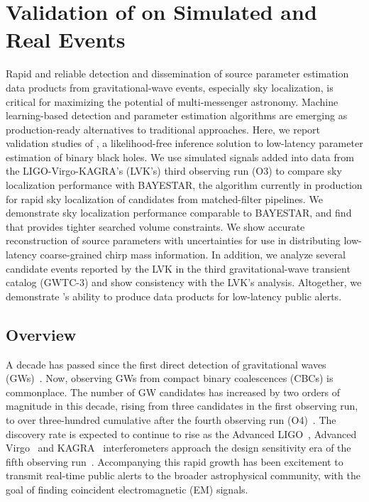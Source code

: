 \chapter{Validation of \amplfi on Simulated and Real Events}
\label{chap:amplfi_results}

\begin{refsection}

Rapid and reliable detection and dissemination of source parameter estimation data products from gravitational-wave events, especially sky localization, is critical for maximizing the potential of multi-messenger astronomy. 
Machine learning-based detection and parameter estimation algorithms are emerging as production-ready alternatives to traditional approaches. 
Here, we report validation studies of \amplfi, a likelihood-free inference solution to low-latency parameter estimation of binary black holes. 
We use simulated signals added into data from the LIGO-Virgo-KAGRA's (LVK's) third observing run (O3) to compare sky localization performance with BAYESTAR, the algorithm currently in production for rapid sky localization of candidates from matched-filter pipelines. 
We demonstrate sky localization performance comparable to BAYESTAR, and find that \amplfi provides tighter searched volume constraints. 
We show accurate reconstruction of source parameters with uncertainties for use in distributing low-latency coarse-grained chirp mass information. 
In addition, we analyze several candidate events reported by the LVK in the third gravitational-wave transient catalog (GWTC-3) and show consistency with the LVK's analysis. 
Altogether, we demonstrate \amplfi's ability to produce data products for low-latency public alerts.


\section{Overview}  \label{amp_res_sec:intro}
A decade has passed since the first direct detection of gravitational waves (GWs)~\cite{AbEA2016a}. 
Now, observing GWs from compact binary coalescences (CBCs) is commonplace. 
The number of GW candidates has increased by two orders of magnitude in this decade, rising from three candidates in the first observing run, to over three-hundred cumulative after the fourth observing run (O4)~\cite{AbEA2018b, theligoscientificcollaboration2022gwtc21, Abbott_2023, LIGOScientific:2025slb}. 
The discovery rate is expected to continue to rise as the Advanced LIGO~\cite{Aasi_2015}, Advanced Virgo~\cite{Acernese_2015} and KAGRA~\cite{kagra} interferometers approach the design sensitivity era of the fifth observing run~\cite{observing_scenarios}. 
Accompanying this rapid growth has been excitement to transmit real-time public alerts to the broader astrophysical community, with the goal of finding coincident electromagnetic (EM) signals. 


\end{refsection}
